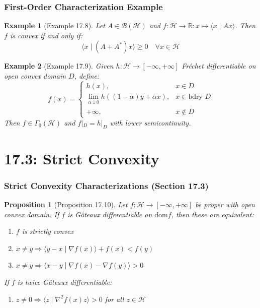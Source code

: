 \documentclass[aspectratio=169,10pt]{beamer}
\newtheorem{prop}{Proposition}
\newtheorem{exmpl}{Example}
\begin{document}
\begin{frame}
  \frametitle{First-Order Characterization Example}

  \begin{exmpl}[Example 17.8]
    Let $A \in \mathcal{B}(\mathcal{H})$ and $f: \mathcal{H} \to \mathbb{R}: x \mapsto \langle x \mid Ax \rangle$. Then $f$ is convex if and only if:
    \[
    \langle x \mid (A + A^*) x \rangle \geq 0 \quad \forall x \in \mathcal{H}
    \]
  \end{exmpl}

  \begin{exmpl}[Example 17.9]
    Given $h: \mathcal{H} \to [-\infty, +\infty]$ Fréchet differentiable on open convex domain $D$, define:
    \[
    f(x) = \begin{cases}
      h(x), & x \in D \\
      \lim_{\alpha \downarrow 0} h((1-\alpha)y + \alpha x), & x \in \text{bdry } D \\
      +\infty, & x \notin \overline{D}
    \end{cases}
    \]
    Then $f \in \Gamma_0(\mathcal{H})$ and $f|_D = h|_D$ with lower semicontinuity.
  \end{exmpl}
\end{frame}

\section{17.3: Strict Convexity}
\begin{frame}
  \frametitle{Strict Convexity Characterizations (Section 17.3)}

  \begin{prop}[Proposition 17.10]
    Let $f: \mathcal{H} \to [-\infty, +\infty]$ be proper with open convex domain. If $f$ is Gâteaux differentiable on $\text{dom} f$, then these are equivalent:
    \begin{enumerate}
      \item[(i)] $f$ is strictly convex
      \item[(ii)] $x \neq y \Rightarrow \langle y - x \mid \nabla f(x) \rangle + f(x) < f(y)$
      \item[(iii)] $x \neq y \Rightarrow \langle x - y \mid \nabla f(x) - \nabla f(y) \rangle > 0$
    \end{enumerate}

    If $f$ is twice Gâteaux differentiable:
    \begin{enumerate}
      \item[(iv)] $z \neq 0 \Rightarrow \langle z \mid \nabla^2 f(x) z \rangle > 0$ for all $z \in \mathcal{H}$
    \end{enumerate}
  \end{prop}
\end{frame}
\end{document}
